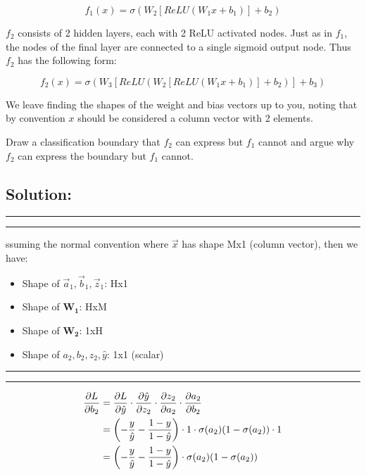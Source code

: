 \documentclass[submit]{harvardml}
\newcommand{\question}[2] {\vspace{.25in} \hrule\vspace{0.5em}
\noindent{\bf #1: #2} \vspace{0.5em}
\hrule \vspace{.10in}}
\renewcommand{\part}[1] {\vspace{.10in} {\bf (#1)}}
\begin{document}
\begin{framed}
\begin{enumerate}
        $$
        f_1(x) = \sigma\left( W_2[ReLU(W_1 x + b_1)] + b_2 \right)
        $$
    
        $f_2$ consists of 2 hidden layers, each with 2 ReLU activated nodes. Just as in $f_1$, the 
        nodes of the final layer are connected to a single sigmoid output node. 
        Thus $f_2$ has the following form:
    
        $$
        f_2(x) = \sigma(W_3[ReLU(W_2[ReLU(W_1 x + b_1)]+b_2)]+ b_3)
        $$
    
        We leave finding the shapes of the weight and bias vectors up to you, noting that 
        by convention $x$ should be considered a column vector with 2 elements. 
    
        Draw a classification boundary that $f_2$ can express but $f_1$ cannot and argue 
        why $f_2$ can express the boundary but $f_1$ cannot.
    
    
    \end{enumerate}  
\end{framed}

\newpage
\subsection*{Solution:}

\question{2.1} 

Assuming the normal convention where $\vec{x}$ has shape Mx1 (column vector), then we have:
\begin{itemize}
  \item Shape of $\vec{a}_1, \vec{b}_1, \vec{z}_1$: Hx1
  \item Shape of $\mathbf{W_1}$: HxM
  \item Shape of $\mathbf{W_2}$: 1xH
  \item Shape of $a_2, b_2, z_2, \hat{y}$: 1x1 (scalar)
\end{itemize}

\question{2.2} 

\part{a}

\begin{align*}
  \pdv{L}{b_2} &= \pdv{L}{\hat{y}}\cdot\pdv{\hat{y}}{z_2}\cdot\pdv{z_2}{a_2}\cdot\pdv{a_2}{b_2} \\ 
  &= \left(-\frac{y}{\hat{y}}-\frac{1-y}{1-\hat{y}} \right)\cdot 1 \cdot \sigma(a_2)(1-\sigma(a_2))\cdot 1 \\
  &=\left(-\frac{y}{\hat{y}}-\frac{1-y}{1-\hat{y}} \right)\cdot \sigma(a_2)(1-\sigma(a_2))
\end{align*}
\end{document}
